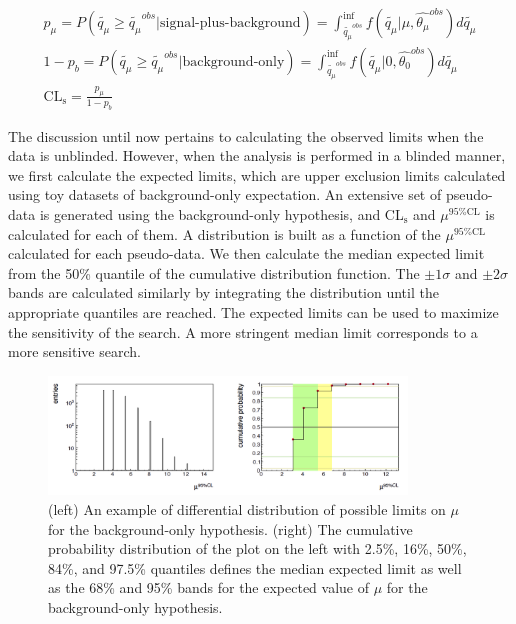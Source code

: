 \begin{gather}
  p_\mu=P(\tilde{q_\mu}\geq \tilde{q_\mu}^{obs}|\text{signal-plus-background})=\int_{\tilde{q_\mu}^{obs}}^{\inf}f(\tilde{q_\mu}|\mu,\hat{\theta_\mu}^{obs})d\tilde{q_\mu} \\
  1-p_b=P(\tilde{q_\mu}\geq \tilde{q_\mu}^{obs}|\text{background-only})=\int_{\tilde{q_\mu}^{obs}}^{\inf}f(\tilde{q_\mu}|0,\hat{\theta_0}^{obs})d\tilde{q_\mu} \\
  \text{CL}_\text{s}=\frac{p_\mu}{1-p_b}
\end{gather}

The discussion until now pertains to calculating the observed limits when the data is unblinded. However, when the analysis is performed in a blinded manner, we first calculate the expected limits, which are upper exclusion limits calculated using toy datasets of background-only expectation. An extensive set of pseudo-data is generated using the background-only hypothesis, and CL$_\text{s}$ and $\mu^{95\%\text{CL}}$ is calculated for each of them. A distribution is built as a function of the $\mu^{95\%\text{CL}}$ calculated for each pseudo-data. We then calculate the median expected limit from the 50\% quantile of the cumulative distribution function. The $\pm 1\sigma$ and $\pm 2\sigma$ bands are calculated similarly by integrating the distribution until the appropriate quantiles are reached. The expected limits can be used to maximize the sensitivity of the search. A more stringent median limit corresponds to a more sensitive search.

\begin{figure}[!htpb]\centering
  \captionsetup{width=.87\textwidth,justification=centering}
  \includegraphics[width=0.85\textwidth]{plots/chapter8/Median.png}
  \caption{(left) An example of differential distribution of possible limits on $\mu$ for the background-only hypothesis. (right) The cumulative probability distribution of the plot on the left with 2.5\%, 16\%, 50\%, 84\%, and 97.5\% quantiles defines the median expected limit as well as the 68\% and 95\% bands for the expected value of $\mu$ for the background-only hypothesis.}
  \label{fig:median}
\end{figure}

